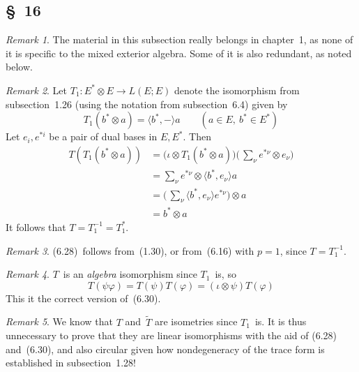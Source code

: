 \documentclass[letterpaper,12pt]{article}
\newcommand{\tprod}{\otimes}
\newcommand{\sprod}[2]{\langle#1,#2\rangle}
\theoremstyle{definition}
\theoremstyle{remark}
\newtheorem*{rmk}{Remark}
\begin{document}
\subsection*{\S~16}
\begin{rmk}
The material in this subsection really belongs in chapter~1, as none of it is specific to the mixed exterior algebra. Some of it is also redundant, as noted below.
\end{rmk}

\begin{rmk}
Let \(T_1:E^*\tprod E\to L(E;E)\) denote the isomorphism from subsection~1.26 (using the notation from subsection~6.4) given by
\[T_1(b^*\tprod a)=\sprod{b^*}{-}a\qquad(a\in E,\ b^*\in E^*)\]
Let \(e_i,e^{*i}\) be a pair of dual bases in \(E,E^*\). Then
\begin{align*}
T(T_1(b^*\tprod a))&=\bigl(\iota\tprod T_1(b^*\tprod a)\bigr)\bigl(\,\sum_{\nu}e^{*\nu}\tprod e_{\nu}\bigr)\\
	&=\sum_{\nu}e^{*\nu}\tprod\sprod{b^*}{e_{\nu}}a\\
	&=\bigl(\,\sum_{\nu}\sprod{b^*}{e_{\nu}}e^{*\nu}\bigr)\tprod a\\
	&=b^*\tprod a
\end{align*}
It follows that \(T=T_1^{-1}=T_1^*\).
\end{rmk}

\begin{rmk}
(6.28)~follows from~(1.30), or from~(6.16) with \(p=1\), since \(T=T_1^{-1}\).
\end{rmk}

\begin{rmk}
\(T\)~is an \emph{algebra} isomorphism since \(T_1\)~is, so
\[T(\psi\varphi)=T(\psi)T(\varphi)=(\iota\tprod\psi)T(\varphi)\]
This it the correct version of~(6.30).
\end{rmk}

\begin{rmk}
We know that \(T\) and~\(\widetilde{T}\) are isometries since \(T_1\)~is. It is thus unnecessary to prove that they are linear isomorphisms with the aid of (6.28) and~(6.30), and also circular given how nondegeneracy of the trace form is established in subsection~1.28!
\end{rmk}
\end{document}
